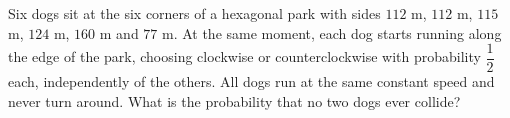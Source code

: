 Six dogs sit at the six corners of a hexagonal park with sides $112$ m, $112$ m, $115$ m, $124$ m, $160$ m and $77$ m. At the same moment, each dog starts running along the edge of the park, choosing clockwise or counterclockwise with probability $\dfrac12$ each, independently of the others. All dogs run at the same constant speed and never turn around. What is the probability that no two dogs ever collide?
